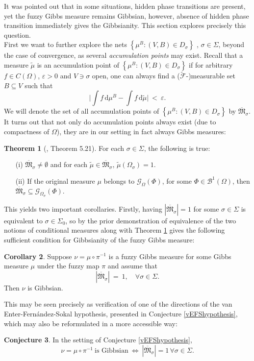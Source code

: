 \documentclass[12pt]{article}
\newcommand{\BB}{\mathscr{B}}
\renewcommand{\d}{\mathrm{d}}
\newcommand{\F}{\mathcal{F}}
\newcommand{\G}{\mathcal{G}}
\newcommand{\MM}{\mathfrak{M}}
\newcommand{\set}[1]{\left\{#1\right\}}
\newcommand{\1}{\mathbbm{1}}
\newcommand{\5}{\vspace{0.5cm}}
\renewcommand{\tilde}{\widetilde}
\theoremstyle{definition}
\newtheorem{thm}{Theorem}[section]
\newtheorem{cor}[thm]{Corollary}
\newtheorem{conj}[thm]{Conjecture}
\begin{document}
It was pointed out that in some situations, hidden phase transitions are present, yet the fuzzy Gibbs measure remains Gibbsian, however, absence of hidden phase transition immediately gives the Gibbsianity. This section explores precisely this question. \\

First we want to further explore the nets $\set{\mu^B:(V,B)\in D_\sigma}$ , $\sigma\in\Sigma$, beyond the case of convergence, as several \textit{accumulation points} may exist. Recall that a measure $\tilde{\mu}$ is an accumulation point of $\set{\mu^B:(V,B)\in D_\sigma}$ if for arbitrary $f\in C(\Omega)$, $\varepsilon>0$ and $V\ni \sigma$ open, one can always find a ($\tilde{\F}$-)measurable set $B\subseteq V$ such that 
$$\Big|\int f\,\d\mu^B - \int f\,\d\tilde{\mu}\Big| ~<~ \varepsilon.$$
We will denote the set of all accumulation points of $\set{\mu^B:(V,B)\in D_\sigma}$ by $\overline{\MM}_\sigma$. It turns out that not only do accumulation points always exist (due to compactness of $\Omega$), they are in our setting in fact always Gibbs measures:
\begin{thm}[\cite{Ber}, Theorem 5.21]\label{thm:TjurFibre}
For each $\sigma\in\Sigma$, the following is true:
\begin{itemize}
	\item[(i)] $\overline{\MM}_\sigma\neq \emptyset$ and for each $\tilde{\mu}\in\overline{\MM}_\sigma$, $\tilde{\mu}(\Omega_\sigma)=1$.
	\item[(ii)] If the original measure $\mu$ belongs to $\G_\Omega(\Phi)$, for some $\Phi\in\BB^1(\Omega)$, then $\overline{\MM}_\sigma\subseteq\G_{\Omega_\sigma}(\Phi)$.
\end{itemize}
\end{thm} 

This yields two important corollaries. Firstly, having $|\overline{\MM}_\sigma|=1$ for some $\sigma\in\Sigma$ is equivalent to $\sigma\in\Sigma_0$, so by the prior demonstration of equivalence of the two notions of conditional measures along with Theorem \ref{thm:TjurFibre} gives the following sufficient condition for Gibbsianity of the fuzzy Gibbs measure:
\begin{cor}\label{vEFSprovendirection}
Suppose $\nu=\mu\circ\pi^{-1}$ is a fuzzy Gibbs measure for some Gibbs measure $\mu$ under the fuzzy map $\pi$ and assume that 
$$|\overline{\MM}_\sigma| ~=~ 1, \quad \forall \sigma\in\Sigma.$$
Then $\nu$ is Gibbsian.
\end{cor}

This may be seen precisely as verification of one of the directions of the van Enter-Fern\'andez-Sokal hypothesis, presented in Conjecture \ref{vEFShypothesis}, which may also be reformulated in a more accessible way:
\begin{conj}\label{vEFShypothesis2}
In the setting of Conjecture \ref{vEFShypothesis},
$$\nu=\mu\circ\pi^{-1}~\text{is Gibbsian}~\iff~|\overline{\MM}_\sigma|=1\,\forall \sigma\in\Sigma.$$
\end{conj}
\end{document}
